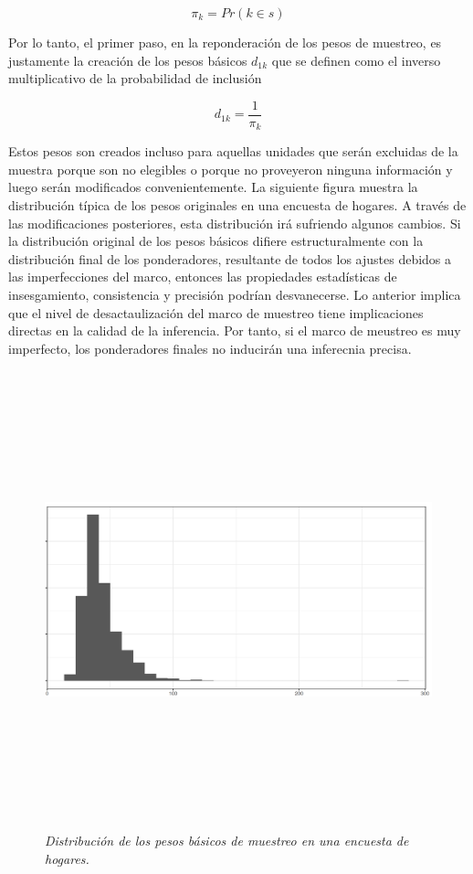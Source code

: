 \[\pi_k = Pr (k \in s)\]

Por lo tanto, el primer paso, en la reponderación de los pesos de muestreo, es justamente la creación de los pesos básicos \(d_{1k}\) que se definen como el inverso multiplicativo de la probabilidad de inclusión

\[d_{1k} = \frac{1}{\pi_k}\]

Estos pesos son creados incluso para aquellas unidades que serán excluidas de la muestra porque son no elegibles o porque no proveyeron ninguna información y luego serán modificados convenientemente. La siguiente figura muestra la distribución típica de los pesos originales en una encuesta de hogares. A través de las modificaciones posteriores, esta distribución irá sufriendo algunos cambios. Si la distribución original de los pesos básicos difiere estructuralmente con la distribución final de los ponderadores, resultante de todos los ajustes debidos a las imperfecciones del marco, entonces las propiedades estadísticas de insesgamiento, consistencia y precisión podrían desvanecerse. Lo anterior implica que el nivel de desactaulización del marco de muestreo tiene implicaciones directas en la calidad de la inferencia. Por tanto, si el marco de meustreo es muy imperfecto, los ponderadores finales no inducirán una inferecnia precisa.

\begin{figure}
\centering
\includegraphics[width=\textwidth,height=5.20833in]{Pics/15.png}
\caption{\emph{Distribución de los pesos básicos de muestreo en una encuesta de hogares.}}
\end{figure}

